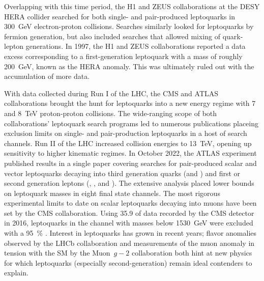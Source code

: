 Overlapping with this time period, the H1 and ZEUS collaborations at the DESY HERA collider searched for both single- and pair-produced leptoquarks in \SI{300}{\GeV} electron-proton collisions. Searches similarly looked for leptoquarks by fermion generation, but also included searches that allowed mixing of quark-lepton generations. In 1997, the H1 and ZEUS collaborations reported a data excess corresponding to a  first-generation leptoquark with a mass of roughly \SI{200}{\GeV}, known as the HERA anomaly. This was ultimately ruled out with the accumulation of more data.

With data collected during Run I of the LHC, the CMS and ATLAS collaborations brought the hunt for leptoquarks into a new energy regime with 7 and \SI{8}{\TeV} proton-proton collisions. The wide-ranging scope of both collaborations' leptoquark search programs led to numerous publications placeing exclusion limits on single- and pair-production leptoquarks in a host of search channels. Run II of the LHC increased collision energies to \SI{13}{\TeV}, opening up sensitivity to higher kinematic regimes. In October 2022, the ATLAS experiment published results in a single paper covering searches for pair-produced scalar and vector leptoquarks decaying into third generation quarks (\Ptop and \Pbottom) and first or second generation leptons (\Pe, \Pmu, and \Pnu). The extensive analysis placed lower bounds on leptoquark masses in eight final state channels. The most rigorous experimental limits to date on scalar leptoquarks decaying into muons have been set by the CMS collaboration. Using \SI{35.9}{\invfb} of data recorded by the CMS detector in 2016, leptoquarks in the \mumujj channel with masses below \SI{1530}{\GeV} were excluded with a \SI{95}{\%} \CL. Interest in leptoquarks has grown in recent years; flavor anomalies observed by the LHCb collaboration and measurements of the muon anomaly in tension with the SM by the Muon~$g-2$ collaboration both hint at new physics for which leptoquarks (especially second-generation) remain ideal contenders to explain.

